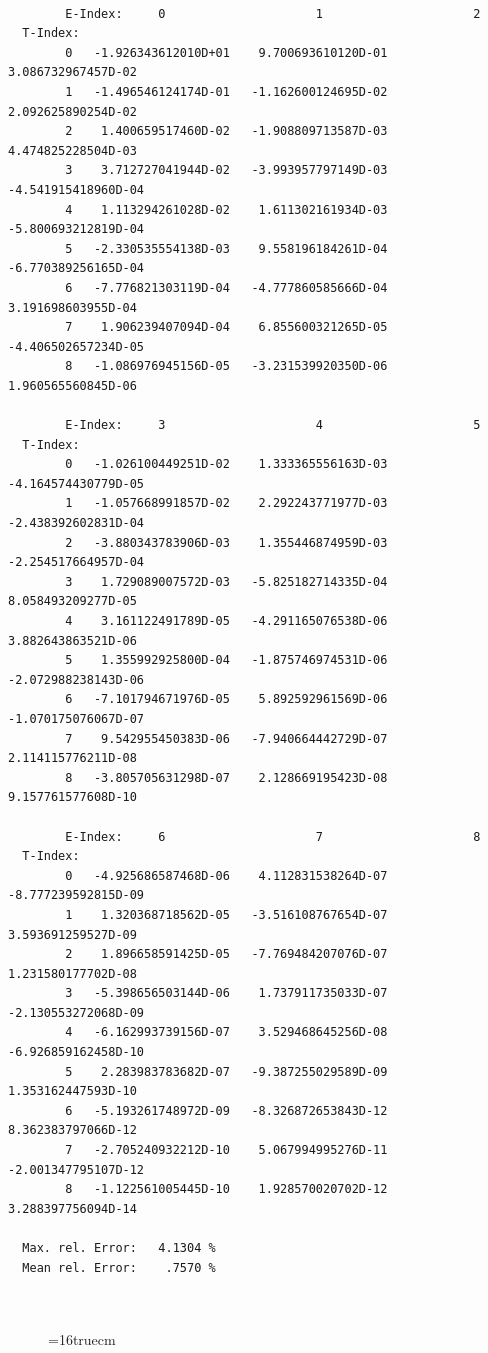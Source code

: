 \documentclass[12pt,dvips]{article}
\begin{document}
\begin{small}\begin{verbatim}

        E-Index:     0                     1                     2
  T-Index:
        0   -1.926343612010D+01    9.700693610120D-01    3.086732967457D-02
        1   -1.496546124174D-01   -1.162600124695D-02    2.092625890254D-02
        2    1.400659517460D-02   -1.908809713587D-03    4.474825228504D-03
        3    3.712727041944D-02   -3.993957797149D-03   -4.541915418960D-04
        4    1.113294261028D-02    1.611302161934D-03   -5.800693212819D-04
        5   -2.330535554138D-03    9.558196184261D-04   -6.770389256165D-04
        6   -7.776821303119D-04   -4.777860585666D-04    3.191698603955D-04
        7    1.906239407094D-04    6.855600321265D-05   -4.406502657234D-05
        8   -1.086976945156D-05   -3.231539920350D-06    1.960565560845D-06

        E-Index:     3                     4                     5
  T-Index:
        0   -1.026100449251D-02    1.333365556163D-03   -4.164574430779D-05
        1   -1.057668991857D-02    2.292243771977D-03   -2.438392602831D-04
        2   -3.880343783906D-03    1.355446874959D-03   -2.254517664957D-04
        3    1.729089007572D-03   -5.825182714335D-04    8.058493209277D-05
        4    3.161122491789D-05   -4.291165076538D-06    3.882643863521D-06
        5    1.355992925800D-04   -1.875746974531D-06   -2.072988238143D-06
        6   -7.101794671976D-05    5.892592961569D-06   -1.070175076067D-07
        7    9.542955450383D-06   -7.940664442729D-07    2.114115776211D-08
        8   -3.805705631298D-07    2.128669195423D-08    9.157761577608D-10

        E-Index:     6                     7                     8
  T-Index:
        0   -4.925686587468D-06    4.112831538264D-07   -8.777239592815D-09
        1    1.320368718562D-05   -3.516108767654D-07    3.593691259527D-09
        2    1.896658591425D-05   -7.769484207076D-07    1.231580177702D-08
        3   -5.398656503144D-06    1.737911735033D-07   -2.130553272068D-09
        4   -6.162993739156D-07    3.529468645256D-08   -6.926859162458D-10
        5    2.283983783682D-07   -9.387255029589D-09    1.353162447593D-10
        6   -5.193261748972D-09   -8.326872653843D-12    8.362383797066D-12
        7   -2.705240932212D-10    5.067994995276D-11   -2.001347795107D-12
        8   -1.122561005445D-10    1.928570020702D-12    3.288397756094D-14

  Max. rel. Error:   4.1304 %
  Mean rel. Error:    .7570 %



\end{verbatim}\end{small}
\begin{figure} \label{7.2b}
\epsfxsize=16truecm
\end{figure}
\newpage
\end{document}
